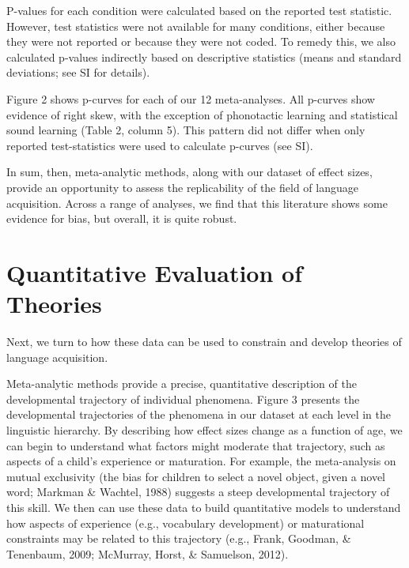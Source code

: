 \documentclass[9pt,twocolumn,twoside,lineno]{pnas-new}
\begin{document}
P-values for each condition were calculated based on the reported test
statistic. However, test statistics were not available for many
conditions, either because they were not reported or because they were
not coded. To remedy this, we also calculated p-values indirectly based
on descriptive statistics (means and standard deviations; see SI for
details).

Figure 2 shows p-curves for each of our 12 meta-analyses. All p-curves
show evidence of right skew, with the exception of phonotactic learning
and statistical sound learning (Table 2, column 5). This pattern did not
differ when only reported test-statistics were used to calculate
p-curves (see SI).

In sum, then, meta-analytic methods, along with our dataset of effect
sizes, provide an opportunity to assess the replicability of the field
of language acquisition. Across a range of analyses, we find that this
literature shows some evidence for bias, but overall, it is quite
robust.

\section*{Quantitative Evaluation of
Theories}\label{quantitative-evaluation-of-theories}

Next, we turn to how these data can be used to constrain and develop
theories of language acquisition.

Meta-analytic methods provide a precise, quantitative description of the
developmental trajectory of individual phenomena. Figure 3 presents the
developmental trajectories of the phenomena in our dataset at each level
in the linguistic hierarchy. By describing how effect sizes change as a
function of age, we can begin to understand what factors might moderate
that trajectory, such as aspects of a child's experience or maturation.
For example, the meta-analysis on mutual exclusivity (the bias for
children to select a novel object, given a novel word; Markman \&
Wachtel, 1988) suggests a steep developmental trajectory of this skill.
We then can use these data to build quantitative models to understand
how aspects of experience (e.g., vocabulary development) or maturational
constraints may be related to this trajectory (e.g., Frank, Goodman, \&
Tenenbaum, 2009; McMurray, Horst, \& Samuelson, 2012).
\end{document}
